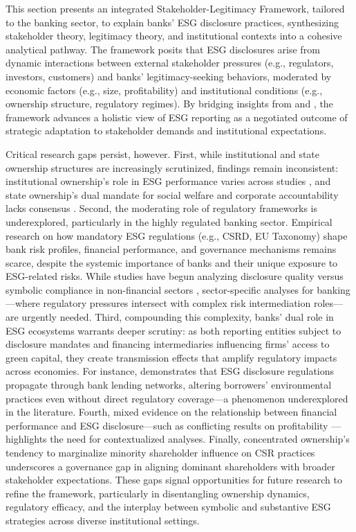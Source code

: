 \documentclass[
  authoryear]{elsarticle}
\begin{document}
This section presents an integrated Stakeholder-Legitimacy Framework,
tailored to the banking sector, to explain banks' ESG disclosure
practices, synthesizing stakeholder theory, legitimacy theory, and
institutional contexts into a cohesive analytical pathway. The framework
posits that ESG disclosures arise from dynamic interactions between
external stakeholder pressures (e.g., regulators, investors, customers)
and banks' legitimacy-seeking behaviors, moderated by economic factors
(e.g., size, profitability) and institutional conditions (e.g.,
ownership structure, regulatory regimes). By bridging insights from
\citet{CAMPBELL2007} and \citet{AGUINIS2012}, the framework advances a
holistic view of ESG reporting as a negotiated outcome of strategic
adaptation to stakeholder demands and institutional expectations.

Critical research gaps persist, however. First, while institutional and
state ownership structures are increasingly scrutinized, findings remain
inconsistent: institutional ownership's role in ESG performance varies
across studies \citep[e.g.,][]{DYCK2019, ALUCHNA2022}, and state
ownership's dual mandate for social welfare and corporate accountability
lacks consensus \citep{TAGESSON2009, RAIMO2020}. Second, the moderating
role of regulatory frameworks is underexplored, particularly in the
highly regulated banking sector. Empirical research on how mandatory ESG
regulations (e.g., CSRD, EU Taxonomy) shape bank risk profiles,
financial performance, and governance mechanisms remains scarce, despite
the systemic importance of banks and their unique exposure to
ESG-related risks. While studies have begun analyzing disclosure quality
versus symbolic compliance in non-financial sectors
\citep{CICCHIELLO2023, MANOS2024}, sector-specific analyses for
banking---where regulatory pressures intersect with complex risk
intermediation roles---are urgently needed. Third, compounding this
complexity, banks' dual role in ESG ecosystems warrants deeper scrutiny:
as both reporting entities subject to disclosure mandates and financing
intermediaries influencing firms' access to green capital, they create
transmission effects that amplify regulatory impacts across economies.
For instance, \citet{WANG2023} demonstrates that ESG disclosure
regulations propagate through bank lending networks, altering borrowers'
environmental practices even without direct regulatory coverage---a
phenomenon underexplored in the literature. Fourth, mixed evidence on
the relationship between financial performance and ESG disclosure---such
as conflicting results on profitability
\citep{HADDOCK2005, DYDUCH2017}---highlights the need for contextualized
analyses. Finally, concentrated ownership's tendency to marginalize
minority shareholder influence on CSR practices
\citep{SMITH2022, BORGES2024} underscores a governance gap in aligning
dominant shareholders with broader stakeholder expectations. These gaps
signal opportunities for future research to refine the framework,
particularly in disentangling ownership dynamics, regulatory efficacy,
and the interplay between symbolic and substantive ESG strategies across
diverse institutional settings.


  
\end{document}
